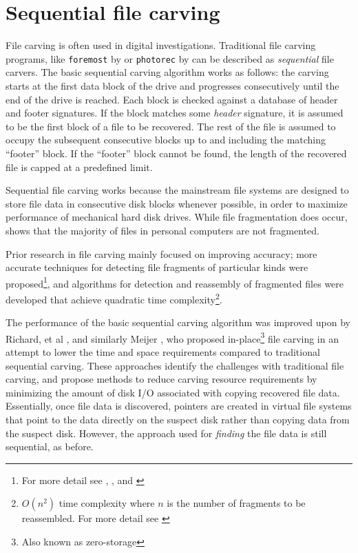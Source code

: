 \documentclass[final,5p,times,twocolumn,authoryear]{elsarticle}
\begin{document}
\section{Sequential file carving}

File carving is often used in digital investigations. Traditional file carving programs, like {\tt foremost} by \citep{richard2005scalpel} or {\tt photorec} by \citep{grenier2007photorec} can be described as \emph{sequential} file carvers. The basic sequential carving algorithm works as follows: the carving starts at the first data block of the drive and progresses consecutively until the end of the drive is reached. Each block is checked against a database of header and footer signatures. If the block matches some \emph{header} signature, it is assumed to be the first block of a file to be recovered. The rest of the file is assumed to occupy the subsequent consecutive blocks up to and including the matching ``footer'' block. If the ``footer'' block cannot be found, the length of the recovered file is capped at a predefined limit. 

Sequential file carving works because the mainstream file systems are designed to store file data in consecutive disk blocks whenever possible, in order to maximize performance of mechanical hard disk drives. While file fragmentation does occur, \citep{garfinkel2007carving} shows that the majority of files in personal computers are not fragmented.  

Prior research in file carving mainly focused on improving accuracy; more accurate techniques for detecting file fragments of particular kinds were proposed\footnote{For more detail see \citep{Veenman2007statistical}, \citep{li2011novel}, and \citep{Garfinkel2015hashbased}}, and algorithms for detection and reassembly of fragmented files were developed that achieve quadratic time complexity\footnote{$O(n^2)$ time complexity where $n$ is the number of fragments to be reassembled. For more detail see \citep{memon2006automated}}. 

The performance of the basic sequential carving algorithm was improved upon by Richard, et al \citep{Richard2007inplace}, and similarly Meijer \citep{MeijerRob2012}, who proposed in-place\footnote{Also known as zero-storage} file carving in an attempt to lower the time and space requirements compared to traditional sequential carving. These approaches identify the challenges with traditional file carving, and propose methods to reduce carving resource requirements by minimizing the amount of disk I/O associated with copying recovered file data. Essentially, once file data is discovered, pointers are created in virtual file systems that point to the data directly on the suspect disk rather than copying data from the suspect disk. However, the approach used for \emph{finding} the file data is still sequential, as before.
\end{document}
